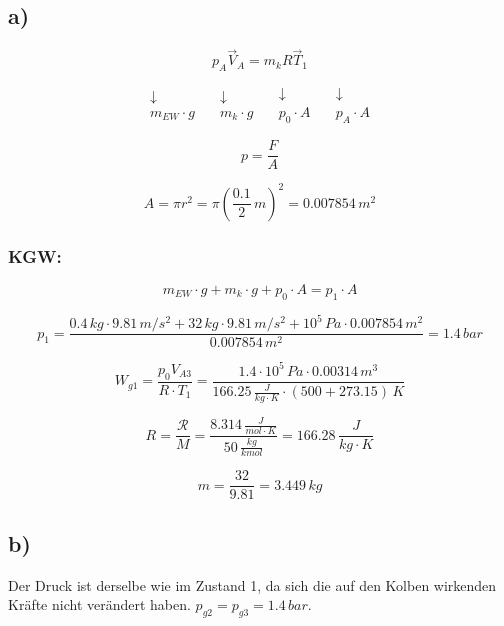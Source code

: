 \subsection*{a)}

\[
p_A \vec{V}_A = m_k R \vec{T}_1
\]

\[
\begin{array}{c}
\downarrow \\
m_{EW} \cdot g
\end{array}
\quad
\begin{array}{c}
\downarrow \\
m_k \cdot g
\end{array}
\quad
\begin{array}{c}
\downarrow \\
p_0 \cdot A
\end{array}
\quad
\begin{array}{c}
\downarrow \\
p_A \cdot A
\end{array}
\]

\[
p = \frac{F}{A}
\]

\[
A = \pi r^2 = \pi \left( \frac{0.1}{2} \, m \right)^2 = 0.007854 \, m^2
\]

\subsubsection*{KGW:}

\[
m_{EW} \cdot g + m_k \cdot g + p_0 \cdot A = p_1 \cdot A
\]

\[
p_1 = \frac{0.4 \, kg \cdot 9.81 \, m/s^2 + 32 \, kg \cdot 9.81 \, m/s^2 + 10^5 \, Pa \cdot 0.007854 \, m^2}{0.007854 \, m^2} = 1.4 \, bar
\]

\[
W_{g1} = \frac{p_0 V_{A3}}{R \cdot T_1} = \frac{1.4 \cdot 10^5 \, Pa \cdot 0.00314 \, m^3}{166.25 \, \frac{J}{kg \cdot K} \cdot (500 + 273.15) \, K}
\]

\[
R = \frac{\mathcal{R}}{M} = \frac{8.314 \, \frac{J}{mol \cdot K}}{50 \, \frac{kg}{kmol}} = 166.28 \, \frac{J}{kg \cdot K}
\]

\[
m = \frac{32}{9.81} = 3.449 \, kg
\]

\subsection*{b)}

Der Druck ist derselbe wie im Zustand 1, da sich die auf den Kolben wirkenden Kräfte nicht verändert haben. \( p_{g2} = p_{g3} = 1.4 \, bar \).

